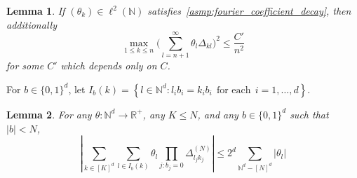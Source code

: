 \documentclass{article}
\newcommand{\Reals}{\mathbb{R}}
\newcommand{\abs}[1]{\left \lvert #1 \right \rvert}
\newcommand{\set}[1]{\left\{#1\right\}}
\newcommand{\1}{\mathbf{1}}
\newcommand{\Nbb}{\mathbb{N}}
\theoremstyle{alden}
\theoremstyle{aldenthm}
\newtheorem{lemma}{Lemma}
\theoremstyle{definition}
\theoremstyle{remark}
\begin{document}
\begin{lemma}
If $(\theta_k) \in \ell^2(\Nbb)$ satisfies~\eqref{asmp:fourier_coefficient_decay}, then additionally
\begin{equation*}
\max_{1 \leq k \leq n} \biggl(\sum_{l = n + 1}^{\infty} \theta_l \Delta_{kl}\biggr)^2 \leq \frac{C'}{n^2}
\end{equation*}
for some $C'$ which depends only on $C$.
\end{lemma}	

For $b \in \{0,1\}^d$, let $I_b(k) = \set{l \in \Nbb^d: l_ib_i = k_ib_i~~\textrm{for each}~~i = 1,\ldots,d}$.

\begin{lemma}
	\label{lem:double_counting}
	For any $\theta: \mathbb{N}^d \to \Reals^+$, any $K \leq N$, and any $b \in \{0,1\}^d$ such that $\abs{b} < N$, 
	\begin{equation}
	\label{eqn:double_counting}
	\abs{\sum_{k \in [K]^d} \sum_{l \in I_b(k)} \theta_l \prod_{j:b_j = 0} \Delta_{l_jk_j}^{(N)}} \leq 2^d \sum_{\mathbb{N}^d -[N]^d} \abs{\theta_l}
	\end{equation}
\end{lemma}
\end{document}

